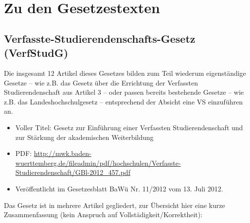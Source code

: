 \documentclass[
10pt,
a4paper,
twoside,								%
titlepage=false,							%
draft=false								%
]{scrartcl}
\begin{document}
\section{Zu den Gesetzestexten}
\subsection{Verfasste-Studierendenschafts-Gesetz (VerfStudG)}

Die insgesamt 12 Artikel dieses Gesetzes bilden zum Teil wiederum eigenständige Gesetze – wie z.B. das Gesetz über die Errichtung der Verfassten Studierendenschaft aus Artikel 3 – oder passen bereits bestehende Gesetze – wie z.B. das Landeshochschulgesetz – entsprechend der Absicht eine VS einzuführen an.

\begin{itemize}
	\item Voller Titel: Gesetz zur Einführung einer Verfassten Studierendenschaft und zur Stärkung der akademischen Weiterbildung
	\item PDF: \url{http://mwk.baden-wuerttemberg.de/fileadmin/pdf/hochschulen/Verfasste-Studierendenschaft/GBl-2012_457.pdf}
	\item Veröffentlicht im Gesetzesblatt BaWü Nr. 11/2012 vom 13. Juli 2012.
\end{itemize}

Das Gesetz ist in mehrere Artikel gegliedert, zur Übersicht hier eine kurze Zusammenfassung (kein Anspruch auf Vollstädigkeit/Korrektheit):
\end{document}
